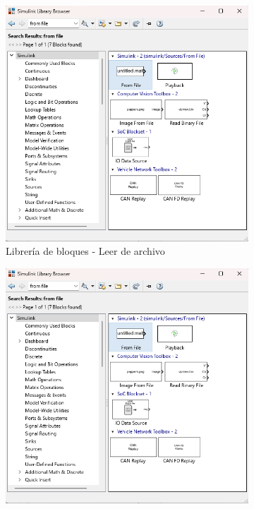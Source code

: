 \begin{figure}[htbp]
    \centering
    \begin{subfigure}[b]{0.35\textwidth}
        \centering
        \includegraphics[width=\textwidth]{fig/Capitulo5/Caso_de_estudio_IMU/Generador_de_salidas/libreia_de_bloques_from_file.png}
        \caption{Librería de bloques - Leer de archivo}
        \label{fig:lib_bloques_from_file_IMU}
    \end{subfigure}
    \hfill
    \begin{subfigure}[b]{0.45\textwidth}
        \centering
        \includegraphics[width=\textwidth]{fig/Capitulo5/Caso_de_estudio_IMU/Generador_de_salidas/libreia_de_bloques_from_file.png}

\end{subfigure}
\end{figure}
